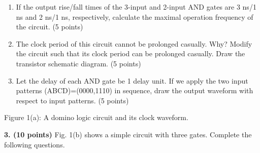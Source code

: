 \documentclass[10pt]{article}
\begin{document}
\begin{enumerate}[label=(\alph*),leftmargin=7mm,itemsep=3pt]
\item If the output rise/fall times of the 3-input and 2-input AND gates are 3 ns/1 ns and 2 ns/1 ns, respectively, calculate the maximal operation frequency of the circuit. (5 points)
\item The clock period of this circuit cannot be prolonged casually. Why? Modify the circuit such that its clock period can be prolonged casually. Draw the transistor schematic diagram. (5 points)
\item Let the delay of each AND gate be 1 delay unit. If we apply the two input patterns (ABCD)=(0000,1110) in sequence, draw the output waveform with respect to input patterns. (5 points)
\end{enumerate}\begin{center}\end{center}
\begin{center}\small Figure 1(a): A domino logic circuit and its clock waveform.\end{center}\newpage\textbf{3. (10 points)} Fig. 1(b) shows a simple circuit with three gates. Complete the following questions.
\end{document}
